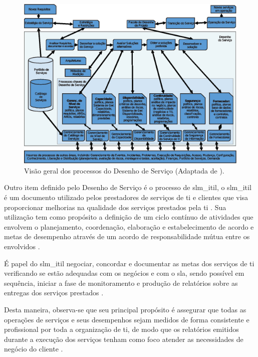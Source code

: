 \begin{figure}[!h]
  \centering
  \includegraphics[width=1\textwidth]{figuras/desenho-servico.eps} 
  \caption{Visão geral dos processos do Desenho de Serviço (Adaptada de \cite{abreu2012implantando, servicedesign}).}
  \label{relacao-desenho-servico} 
\end{figure}

Outro item definido pelo Desenho de Serviço é o processo de \gls{slm_itil}, o \acrshort{slm_itil} é um documento utilizado pelos prestadores de serviços de \acrshort{ti} e clientes que visa proporcionar melhorias na qualidade dos serviços prestados pela \acrshort{ti} \cite{introductoryoverviewofitil}. Sua utilização tem como propósito a definição de um ciclo contínuo de atividades que envolvem o planejamento, coordenação, elaboração e estabelecimento de acordo e metas de desempenho através de um acordo de responsabilidade mútua entre os envolvidos \cite{abreu2012implantando}.

É papel do \acrshort{slm_itil} negociar, concordar e documentar as metas dos serviços de \acrshort{ti} verificando se estão adequadas com os negócios e com o \acrshort{sla}, sendo possível em sequência, iniciar a fase de monitoramento e produção de relatórios sobre as entregas dos serviços prestados \cite{introductoryoverviewofitil}. 

Desta maneira, observa-se que seu principal propósito é assegurar que todas as operações de serviços e seus desempenhos sejam medidos de forma consistente e profissional por toda a organização de \acrshort{ti}, de modo que os relatórios emitidos durante a execução dos serviços tenham como foco atender as necessidades de negócio do cliente \cite{introductoryoverviewofitil}.

